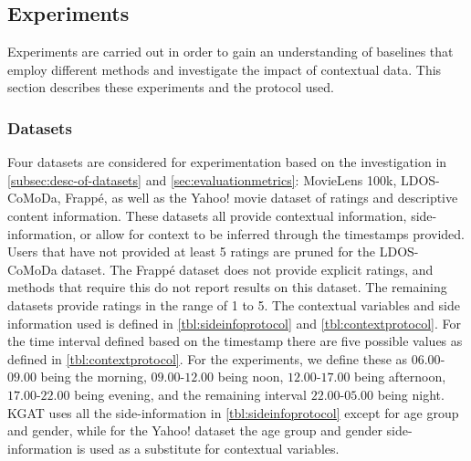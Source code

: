 \subsection{Experiments}\label{subsec:experimentprotocol}
Experiments are carried out in order to gain an understanding of baselines that employ different methods and investigate the impact of contextual data.
This section describes these experiments and the protocol used.

\subsubsection{Datasets}
Four datasets are considered for experimentation based on the investigation in \cref{subsec:desc-of-datasets} and \cref{sec:evaluationmetrics}: MovieLens 100k, LDOS-CoMoDa, Frappé, as well as the Yahoo! movie dataset of ratings and descriptive content information\cite{Yahoo!-movie}.
These datasets all provide contextual information, side-information, or allow for context to be inferred through the timestamps provided.
Users that have not provided at least 5 ratings are pruned for the LDOS-CoMoDa dataset.
The Frappé dataset does not provide explicit ratings, and methods that require this do not report results on this dataset.
The remaining datasets provide ratings in the range of 1 to 5.
The contextual variables and side information used is defined in \cref{tbl:sideinfoprotocol} and \cref{tbl:contextprotocol}.
For the time interval defined based on the timestamp there are five possible values as defined in \cref{tbl:contextprotocol}.
For the experiments, we define these as $06.00$-$09.00$ being the morning, $09.00$-$12.00$ being noon, $12.00$-$17.00$ being afternoon, $17.00$-$22.00$ being evening, and the remaining interval $22.00$-$05.00$ being night.
KGAT uses all the side-information in \cref{tbl:sideinfoprotocol} except for age group and gender, while for the Yahoo! dataset the age group and gender side-information is used as a substitute for contextual variables. 
\\
